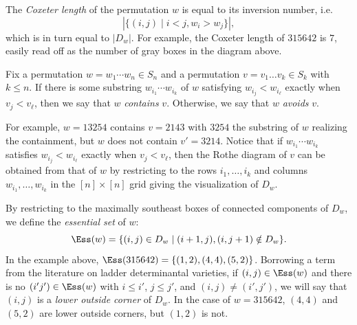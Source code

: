 The \emph{Coxeter length} of the permutation $w$ is equal to its inversion number, i.e. 
\[| \{ (i, j) \mid i < j, w_i > w_j \}|,
\] which is in turn equal to $|D_w|$.  For example, the Coxeter length of $315642$ is $7$, easily read off as the number of gray boxes in the diagram above.

\begin{definition}
Fix a permutation $w = w_1 \cdots w_n \in S_n$ and a permutation $v  = v_1\ldots v_k \in S_k$ with $k \leq n$.  If there is some substring $w_{i_1} \cdots w_{i_k}$ of $w$ satisfying $w_{i_j} < w_{i_\ell}$ exactly when $v_j < v_\ell$, then we say that $w$ \emph{contains} $v$.  Otherwise, we say that $w$ \emph{avoids} $v$.
\end{definition}

For example, $w = 13254$ contains $v = 2143$ with $3254$ the substring of $w$ realizing the containment, but $w$ does not contain $v' = 3214$.  Notice that if $w_{i_1} \cdots w_{i_k}$ satisfies $w_{i_j} < w_{i_\ell}$ exactly when $v_j < v_\ell$, then the Rothe diagram of $v$ can be obtained from that of $w$ by restricting to the rows $i_1, \ldots, i_k$ and columns $w_{i_1}, \ldots, w_{i_k}$ in the $[n] \times [n]$ grid giving the visualization of $D_w$.  

By restricting to the maximally southeast boxes of connected components of $D_w$, we define the \emph{essential set} of $w$: 
\[
\Ess(w) = \{(i,j) \in D_w \mid (i+1,j), (i,j+1) \notin D_w\}.
\]
In the example above, $\Ess(315642)=\{(1,2),(4,4), (5,2)\}$.  Borrowing a term from the literature on ladder determinantal varieties, if $(i,j) \in \Ess(w)$ and there is no $(i'j') \in \Ess(w)$ with $i \leq i'$, $j \leq j'$, and $(i,j) \neq (i',j')$, we will say that $(i,j)$ is a \emph{lower outside corner} of $D_w$.  In the case of $w = 315642$, $(4,4)$ and $(5,2)$ are lower outside corners, but $(1,2)$ is not.  

